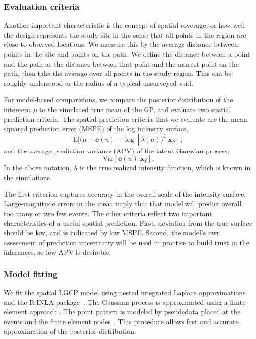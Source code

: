 \documentclass[review]{elsarticle}
\begin{document}
\subsubsection{Evaluation criteria}

Another important characteristic is the concept of spatial coverage, or how
well the design represents the study site in the sense that all points in the
region are close to observed locations. We measure this by the average distance
between points in the site and points on the path. We define the distance
between a point and the path as the distance between that point and the nearest
point on the path, then take the average over all points in the study region.
This can be roughly understood as the radius of a typical unsurveyed void.

For model-based comparisions, we compare the posterior distribution of the
intercept \(\mu\) to the simulated true mean of the GP, and evaluate two
spatial prediction criteria. The spatial prediction criteria that we evaluate
are the mean squared prediction error (MSPE) of the log intensity surface,
\begin{equation}
\mathrm{E}[(\mu + \mathbf{e}(u) - \log[\lambda(u))^{2}|\mathbf{x}_{\mathcal{S}}],
\end{equation}
and the average prediction variance (APV) of the latent Gaussian process,
\begin{equation}
\mathrm{Var}[\mathbf{e}(u)|\mathbf{x}_{\mathcal{S}}].
\end{equation}
In the above notation, \(\lambda\) is the true realized intensity function,
which is known in the simulations.

The first criterion captures accuracy in the overall scale of the intensity
surface. Large-magnitude errors in the mean imply that that model will predict
overall too many or two few events. The other criteria reflect two important
characteristics of a useful spatial prediction. First, deviation from the true
surface should be low, and is indicated by low MSPE. Second, the model's own
assessment of prediction uncertainty will be used in practice to build trust in
the inferences, so low APV is desireble. 


\subsubsection{Model fitting}

We fit the spatial LGCP model using nested integrated Laplace approximations
and the R-INLA package~\citep{rueetal,rinla}. The Gaussian process is
approximated using a finite element approach \citep{lindgrenetal}. The point
pattern is modeled by pseudodata placed at the events and the finite element
nodes~\citep{simpsonetal}. This procedure allows fast and accurate
approximation of the posterior distribution.%
\end{document}
